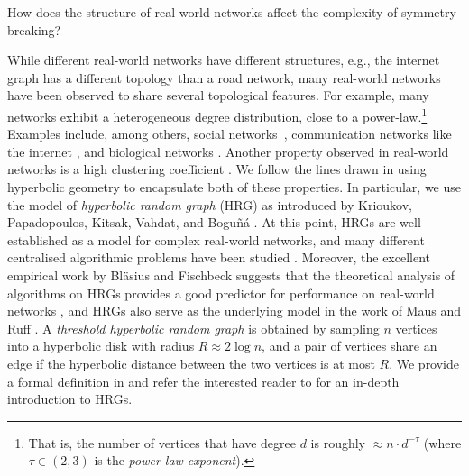 \documentclass[letterpaper,11pt]{article}
\newcommand{\1}{\mathbb I}
\begin{document}
\begin{tcolorbox}
How does the structure of real-world networks affect the complexity of symmetry breaking?
\end{tcolorbox}

While different real-world networks have different structures, e.g., the internet graph has a different topology than a road network, many real-world networks have been observed to share several topological features. For example, many networks exhibit a heterogeneous degree distribution, close to a power-law.\footnote{That is, the number of vertices that have degree $d$ is roughly $\approx n\cdot d^{-\tau}$ (where $\tau \in (2, 3)$ is the \emph{power-law exponent}).} Examples include, among others, social networks~\cite{vhhk-s-19}, communication networks like the internet \cite{faloutsos1999power}, and biological networks \cite{koonin2006power}. Another property observed in real-world networks is a high clustering coefficient \cite{PhysRevE.74.056114, Newman2003, Watts1998}. We follow the lines drawn in \cite{pkbv-info-2010, kpk-h-10, Bogu2010, Serrano2008} using hyperbolic geometry to encapsulate both of these properties. In particular, we use the model of \emph{hyperbolic random graph} (HRG) as introduced by Krioukov, Papadopoulos, Kitsak, Vahdat, and Boguñá \cite{kpk-h-10}. At this point, HRGs are well established as a model for complex real-world networks, and many different centralised algorithmic problems have been studied \cite{bffkmm-icalp-2022,bfk-chrg-18, bfk-tw-2016, katzmann-exactvc-2023, katzmann-approxvc-2023, Kiwi2024, bmrs-stacs-25}. Moreover, the excellent empirical work by Bläsius and Fischbeck suggests that the theoretical analysis of algorithms on HRGs provides a good predictor for performance on real-world networks \cite{bf-evacaga-22}, and HRGs also serve as the underlying model in the work of Maus and Ruff \cite{mr-soda-26}. A \emph{threshold hyperbolic random graph} is obtained by sampling $n$ vertices into a hyperbolic disk with radius $R \approx 2\log n$, and a pair of vertices share an edge if the hyperbolic distance between the two vertices is at most $R$. We provide a formal definition in  and refer the interested reader to \cite{Krohmer2016, katz-diss-23} for an in-depth introduction to HRGs. 
%
\end{document}
